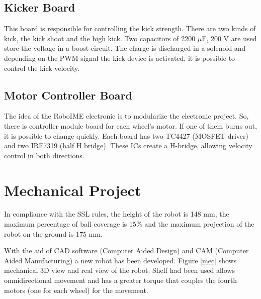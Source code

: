 \documentclass{llncs}
\begin{document}
\subsection{Kicker Board}
This board is responsible for controlling the kick strength. There are two kinds of kick,
the kick shoot and the high kick. Two capacitors of 2200 $\mu$F, 200 V are used store the
voltage in a boost circuit. The charge is discharged in a solenoid and depending on the PWM
signal the kick device is activated, it is possible to control the kick velocity.


\subsection{Motor Controller Board}
The idea of the RoboIME electronic is to modularize the electronic project. So, there
is controller module board for each wheel's motor. If one of them burns out, it is
possible to change quickly. Each board has two TC4427 (MOSFET driver) and two
IRF7319 (half H bridge). These ICs create a H-bridge, allowing velocity control in
both directions.

\section{Mechanical Project}

In compliance with the SSL rules, the height of the robot is 148 mm, the maximum
percentage of ball coverage is 15\% and the maximum projection of the robot on the ground is 175 mm.

With the aid of CAD software (Computer Aided Design) and CAM (Computer Aided
Manufacturing) a new robot has been developed. Figure \ref{mec} shows mechanical
3D view and real view of the robot. Shelf had been used allows omnidirectional
movement and has a greater torque that couples the fourth motors (one for each
wheel) for the movement.
\end{document}
